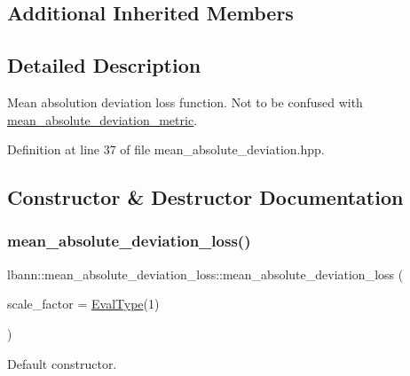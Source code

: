 \subsection*{Additional Inherited Members}


\subsection{Detailed Description}
Mean absolution deviation loss function. Not to be confused with \hyperlink{classlbann_1_1mean__absolute__deviation__metric}{mean\+\_\+absolute\+\_\+deviation\+\_\+metric}. 

Definition at line 37 of file mean\+\_\+absolute\+\_\+deviation.\+hpp.



\subsection{Constructor \& Destructor Documentation}
\mbox{\label{classlbann_1_1mean__absolute__deviation__loss_ab729227237af711003b6cf4a9d9c9cf1}} 
\subsubsection{\texorpdfstring{mean\+\_\+absolute\+\_\+deviation\+\_\+loss()}{mean\_absolute\_deviation\_loss()}\hspace{0.1cm}{\footnotesize\ttfamily [1/2]}}
{\footnotesize\ttfamily lbann\+::mean\+\_\+absolute\+\_\+deviation\+\_\+loss\+::mean\+\_\+absolute\+\_\+deviation\+\_\+loss (\begin{DoxyParamCaption}\item[{\hyperlink{base_8hpp_a3266f5ac18504bbadea983c109566867}{Eval\+Type}}]{scale\+\_\+factor = {\ttfamily \hyperlink{base_8hpp_a3266f5ac18504bbadea983c109566867}{Eval\+Type}(1)} }\end{DoxyParamCaption})\hspace{0.3cm}{\ttfamily [inline]}}

Default constructor. 

